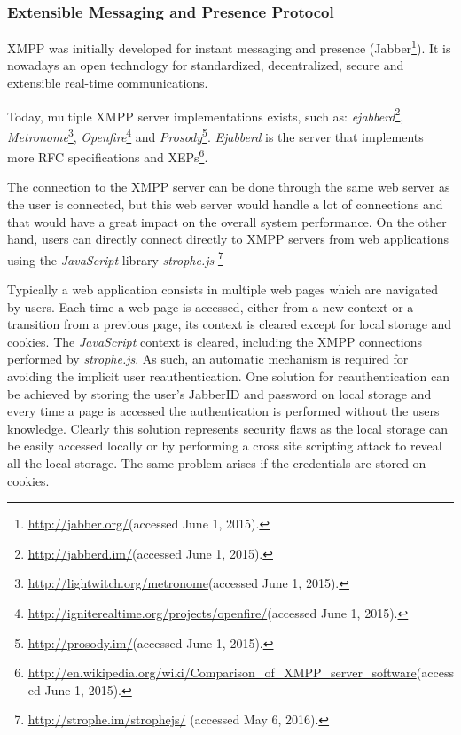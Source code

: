 \documentclass[conference,compsoc,a4paper]{IEEEtran}
\begin{document}
\subsubsection{Extensible Messaging and Presence Protocol}

  \gls{XMPP} was initially developed for instant messaging and presence (Jabber\footnote{\url{http://jabber.org/}(accessed June 1, 2015).}). It is nowadays an open technology for standardized, decentralized, secure and extensible real-time communications. 

 
  Today, multiple \gls{XMPP} server implementations exists, such as: \emph{ejabberd}\footnote{\url{http://jabberd.im/}(accessed June 1, 2015).}, \emph{Metronome}\footnote{\url{http://lightwitch.org/metronome}(accessed June 1, 2015).}, \emph{Openfire}\footnote{\url{http://igniterealtime.org/projects/openfire/}(accessed June 1, 2015).} and \emph{Prosody}\footnote{\url{http://prosody.im/}(accessed June 1, 2015).}. \emph{Ejabberd} is the server that implements more \gls{RFC} specifications and \gls{XEP}s\footnote{\url{http://en.wikipedia.org/wiki/Comparison_of_XMPP_server_software}(accessed June 1, 2015).}.
  

    The connection to the \gls{XMPP} server can be done through the same web server as the user is connected, but this web server would handle a lot of connections and that would have a great impact on the overall system performance. On the other hand, users can directly connect directly to \gls{XMPP} servers from web applications using the \emph{JavaScript} library \emph{strophe.js} \footnote{\url{http://strophe.im/strophejs/} (accessed May 6, 2016).}

    Typically a web application consists in multiple web pages which are navigated by users. Each time a web page is accessed, either from a new context or a transition from a previous page, its context is cleared except for local storage and cookies. The \emph{JavaScript} context is cleared, including the \gls{XMPP} connections performed by \emph{strophe.js}. As such, an automatic mechanism is required for avoiding the implicit user reauthentication.
    One solution for reauthentication can be achieved by storing the user's JabberID and password on local storage and every time a page is accessed the authentication is performed without the users knowledge. Clearly this solution represents security flaws as the local storage can be easily accessed locally or by performing a cross site scripting attack to reveal all the local storage. The same problem arises if the credentials are stored on cookies.
        
\end{document}
